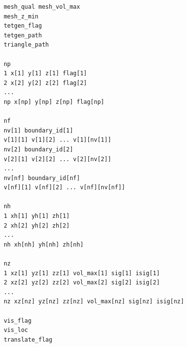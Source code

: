 \documentclass[a4paper,12pt]{article}
\begin{document}
\begin{framed}
    \begingroup
    \small
    \begin{verbatim}
    mesh_qual mesh_vol_max
    mesh_z_min
    tetgen_flag
    tetgen_path
    triangle_path
    
    np
    1 x[1] y[1] z[1] flag[1]
    2 x[2] y[2] z[2] flag[2]
    ...
    np x[np] y[np] z[np] flag[np]
    
    nf
    nv[1] boundary_id[1]
    v[1][1] v[1][2] ... v[1][nv[1]]
    nv[2] boundary_id[2]
    v[2][1] v[2][2] ... v[2][nv[2]]
    ...
    nv[nf] boundary_id[nf]
    v[nf][1] v[nf][2] ... v[nf][nv[nf]]
    
    nh
    1 xh[1] yh[1] zh[1]
    2 xh[2] yh[2] zh[2]
    ...
    nh xh[nh] yh[nh] zh[nh]
    
    nz
    1 xz[1] yz[1] zz[1] vol_max[1] sig[1] isig[1]
    2 xz[2] yz[2] zz[2] vol_max[2] sig[2] isig[2]
    ...
    nz xz[nz] yz[nz] zz[nz] vol_max[nz] sig[nz] isig[nz]
    
    vis_flag
    vis_loc
    translate_flag
\end{verbatim}
    \endgroup
\end{framed}
\end{document}
